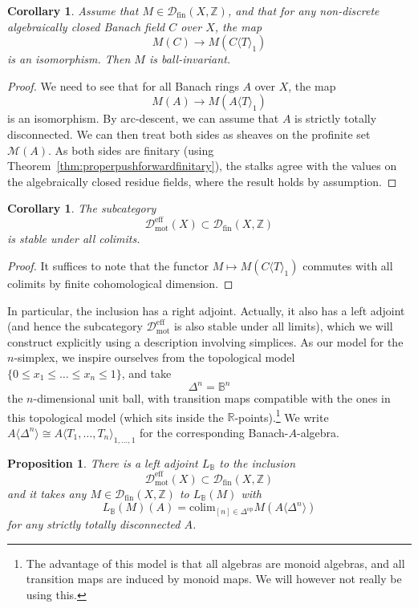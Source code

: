 \documentclass[11pt]{amsart}
\numberwithin{equation}{section}
\numberwithin{theorem}{section}
\newtheorem{corollary}[theorem]{Corollary}
\newtheorem{proposition}[theorem]{Proposition}
\theoremstyle{definition}
\begin{document}
\begin{corollary} Assume that $M\in \mathcal D_{\mathrm{fin}}(X,\mathbb Z)$, and that for any non-discrete algebraically closed Banach field $C$ over $X$, the map
\[
M(C)\to M(C\langle T\rangle_1)
\]
is an isomorphism. Then $M$ is ball-invariant.
\end{corollary}

\begin{proof} We need to see that for all Banach rings $A$ over $X$, the  map
\[
M(A)\to M(A\langle T\rangle_1)
\]
is an isomorphism. By arc-descent, we can assume that $A$ is strictly totally disconnected. We can then treat both sides as sheaves on the profinite set $\mathcal M(A)$. As both sides are finitary (using Theorem~\ref{thm:properpushforwardfinitary}), the stalks agree with the values on the algebraically closed residue fields, where the result holds by assumption.
\end{proof}

\begin{corollary} The subcategory
\[
\mathcal D_{\mathrm{mot}}^{\mathrm{eff}}(X)\subset \mathcal D_{\mathrm{fin}}(X,\mathbb Z)
\]
is stable under all colimits.
\end{corollary}

\begin{proof} It suffices to note that the functor $M\mapsto M(C\langle T\rangle_1)$ commutes with all colimits by finite cohomological dimension.
\end{proof}

In particular, the inclusion has a right adjoint. Actually, it also has a left adjoint (and hence the subcategory $\mathcal D_{\mathrm{mot}}^{\mathrm{eff}}$ is also stable under all limits), which we will construct explicitly using a description involving simplices. As our model for the $n$-simplex, we inspire ourselves from the topological model $\{0\leq x_1\leq \ldots\leq x_n\leq 1\}$, and take
\[
\Delta^n = \mathbb B^n
\]
the $n$-dimensional unit ball, with transition maps compatible with the ones in this topological model (which sits inside the $\mathbb R$-points).\footnote{The advantage of this model is that all algebras are monoid algebras, and all transition maps are induced by monoid maps. We will however not really be using this.} We write $A\langle \Delta^n\rangle\cong A\langle T_1,\ldots,T_n\rangle_{1,\ldots,1}$ for the corresponding Banach-$A$-algebra.

\begin{proposition} There is a left adjoint $L_{\mathbb B}$ to the inclusion
\[
\mathcal D_{\mathrm{mot}}^{\mathrm{eff}}(X)\subset \mathcal D_{\mathrm{fin}}(X,\mathbb Z)
\]
and it takes any $M\in \mathcal D_{\mathrm{fin}}(X,\mathbb Z)$ to $L_{\mathbb B}(M)$ with
\[
L_{\mathbb B}(M)(A) = \mathrm{colim}_{[n]\in \Delta^{\mathrm{op}}} M(A\langle\Delta^n\rangle)
\]
for any strictly totally disconnected $A$.
\end{proposition}
\end{document}
